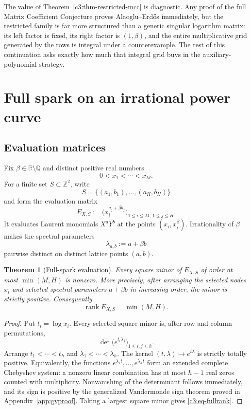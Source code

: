 \documentclass[11pt,oneside]{article}
\newtheorem{theorem}{Theorem}[section]
\theoremstyle{definition}
\theoremstyle{remark}
\newcommand{\Z}{\mathbb Z}
\newcommand{\Q}{\mathbb Q}
\newcommand{\R}{\mathbb R}
\newcommand{\rank}{\operatorname{rank}}
\begin{document}
The value of Theorem~\ref{c3:thm-restricted-mcc} is diagnostic.  Any proof of the full Matrix
Coefficient Conjecture proves Alaoglu--Erd\H{o}s immediately, but the restricted family is far
more structured than a generic singular logarithm matrix: its left factor is fixed,
its right factor is $(1,\beta)$, and the entire multiplicative grid generated by the rows is
integral under a counterexample.  The rest of this continuation asks exactly how much that
integral grid buys in the auxiliary-polynomial strategy.

\section{Full spark on an irrational power curve}
\label{sec:fullspark}

\subsection{Evaluation matrices}

Fix $\beta\in\R\setminus\Q$ and distinct positive real numbers
\[
 0<x_1<\cdots<x_M.
\]
For a finite set $S\subset\Z^2$, write
\[
 S=\{(a_1,b_1),\ldots,(a_H,b_H)\}
\]
and form the evaluation matrix
\begin{equation}
 E_{X,S}:=\bigl(x_i^{a_j+\beta b_j}\bigr)_{
  1\le i\le M,\ 1\le j\le H}.
 \label{c3:eq-evalmatrix}
\end{equation}
It evaluates Laurent monomials $X^aY^b$ at the points
$(x_i,x_i^\beta)$.  Irrationality of $\beta$ makes the spectral parameters
\[
 \lambda_{a,b}:=a+\beta b
\]
pairwise distinct on distinct lattice points $(a,b)$.

\begin{theorem}[Full-spark evaluation]
\label{c3:thm-fullspark}
Every square minor of $E_{X,S}$ of order at most $\min(M,H)$ is nonzero.  More precisely,
after arranging the selected nodes $x_i$ and selected spectral parameters $a+\beta b$ in
increasing order, the minor is strictly positive.  Consequently
\begin{equation}
 \rank E_{X,S}=\min(M,H).
 \label{c3:eq-fullrank}
\end{equation}
\end{theorem}

\begin{proof}
Put $t_i=\log x_i$.  Every selected square minor is, after row and column permutations,
\[
 \det\bigl(e^{t_i\lambda_j}\bigr)_{1\le i,j\le h}.
\]
Arrange $t_1<\cdots<t_h$ and $\lambda_1<\cdots<\lambda_h$.  The kernel
$(t,\lambda)\mapsto e^{t\lambda}$ is strictly totally positive.  Equivalently, the functions
$e^{\lambda_1t},\ldots,e^{\lambda_ht}$ form an extended complete Chebyshev system: a nonzero
linear combination has at most $h-1$ real zeros counted with multiplicity.  Nonvanishing of
the determinant follows immediately, and its sign is positive by the generalized
Vandermonde sign theorem proved in Appendix~\ref{app:gvproof}.  Taking a largest square minor
gives \eqref{c3:eq-fullrank}.
\end{proof}
\end{document}
